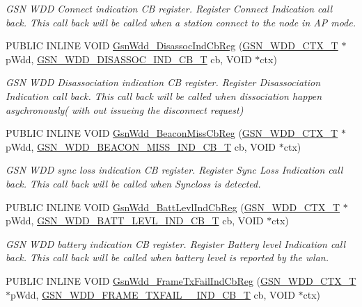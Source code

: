 \begin{DoxyCompactItemize}
\begin{DoxyCompactList}\small\item\em GSN WDD Connect indication CB register. Register Connect Indication call back. This call back will be called when a station connect to the node in AP mode. \end{DoxyCompactList}\item 
PUBLIC INLINE VOID \hyperlink{a00677_gaccdbcdb8561ee5f5d3eff58a67ce1d6a}{GsnWdd\_\-DisassocIndCbReg} (\hyperlink{a00108}{GSN\_\-WDD\_\-CTX\_\-T} $\ast$pWdd, \hyperlink{a00677_gadb536a5e296beff888ffe8f4cdc68507}{GSN\_\-WDD\_\-DISASSOC\_\-IND\_\-CB\_\-T} cb, VOID $\ast$ctx)
\begin{DoxyCompactList}\small\item\em GSN WDD Disassociation indication CB register. Register Disassociation Indication call back. This call back will be called when dissociation happen asychronously( with out issueing the disconnect request) \end{DoxyCompactList}\item 
PUBLIC INLINE VOID \hyperlink{a00677_ga63aadb61c1e3a61401548e4b41c2da8e}{GsnWdd\_\-BeaconMissCbReg} (\hyperlink{a00108}{GSN\_\-WDD\_\-CTX\_\-T} $\ast$pWdd, \hyperlink{a00677_ga6b4e6d07b52788c8ddf01ddaa89429ad}{GSN\_\-WDD\_\-BEACON\_\-MISS\_\-IND\_\-CB\_\-T} cb, VOID $\ast$ctx)
\begin{DoxyCompactList}\small\item\em GSN WDD sync loss indication CB register. Register Sync Loss Indication call back. This call back will be called when Syncloss is detected. \end{DoxyCompactList}\item 
PUBLIC INLINE VOID \hyperlink{a00677_ga927648393bfb957c1a972aecd92c49da}{GsnWdd\_\-BattLevlIndCbReg} (\hyperlink{a00108}{GSN\_\-WDD\_\-CTX\_\-T} $\ast$pWdd, \hyperlink{a00677_gae1fd7b71fd69db9cad751f084daf2199}{GSN\_\-WDD\_\-BATT\_\-LEVL\_\-IND\_\-CB\_\-T} cb, VOID $\ast$ctx)
\begin{DoxyCompactList}\small\item\em GSN WDD battery indication CB register. Register Battery level Indication call back. This call back will be called when battery level is reported by the wlan. \end{DoxyCompactList}\item 
PUBLIC INLINE VOID \hyperlink{a00677_gac7ac7e627b07da56eb1325cb9124461f}{GsnWdd\_\-FrameTxFailIndCbReg} (\hyperlink{a00108}{GSN\_\-WDD\_\-CTX\_\-T} $\ast$pWdd, \hyperlink{a00677_ga7e71a759def3d63d0aff2122a2b21bef}{GSN\_\-WDD\_\-FRAME\_\-TXFAIL\_\-\_\-IND\_\-CB\_\-T} cb, VOID $\ast$ctx)

\end{DoxyCompactItemize}
